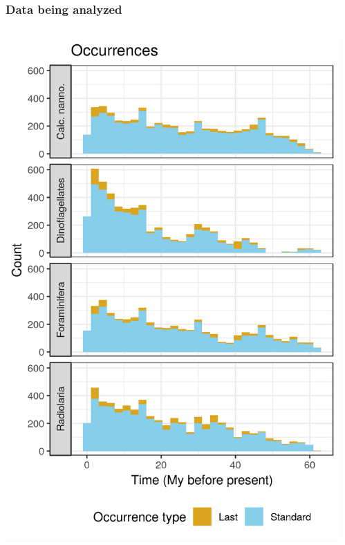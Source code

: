 \documentclass{beamer}
\begin{document}
\begin{frame}
  \frametitle{Data being analyzed}

  \begin{columns}
    \begin{column}{0.5\textwidth}
      \includegraphics[width=\textwidth,height=0.8\textheight,keepaspectratio=true]{../results/figure/occ_time_label}
    \end{column}
    \begin{column}{0.5\textwidth}

\end{column}
\end{columns}
\end{frame}
\end{document}
